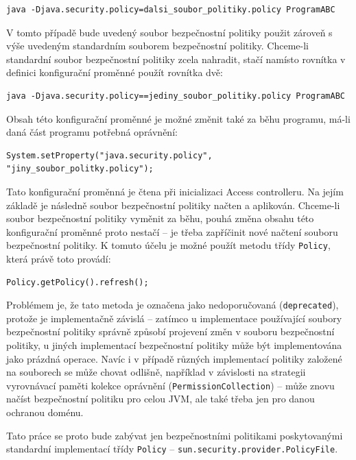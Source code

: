 \begin{verbatim}
java -Djava.security.policy=dalsi_soubor_politiky.policy ProgramABC
\end{verbatim}

V tomto případě bude uvedený soubor bezpečnostní politiky použit zároveň s výše uvedeným standardním souborem bezpečnostní politiky. Chceme-li standardní soubor bezpečnostní politiky zcela nahradit, stačí namísto rovnítka v definici konfigurační proměnné použít rovnítka dvě: \cite[5.3.1]{oaks}

\begin{verbatim}
java -Djava.security.policy==jediny_soubor_politiky.policy ProgramABC
\end{verbatim}

Obsah této konfigurační proměnné je možné změnit také za běhu programu, má-li daná část programu potřebná oprávnění:

\begin{verbatim}
System.setProperty("java.security.policy", "jiny_soubor_politky.policy");
\end{verbatim}

Tato konfigurační proměnná je čtena při inicializaci Access controlleru. Na jejím základě je následně soubor bezpečnostní politiky načten a aplikován. Chceme-li soubor bezpečnostní politiky vyměnit za běhu, pouhá změna obsahu této konfigurační proměnné proto nestačí -- je třeba zapříčinit nové načtení souboru bezpečnostní politiky. K tomuto účelu je možné použít metodu třídy {\tt Policy}, která právě toto provádí:

\begin{verbatim}
Policy.getPolicy().refresh();
\end{verbatim}

Problémem je, že tato metoda je označena jako nedoporučovaná ({\tt deprecated}), protože je implementačně závislá -- zatímco u implementace používající soubory bezpečnostní politiky správně způsobí projevení změn v souboru bezpečnostní politiky, u jiných implementací bezpečnostní politiky může být implementována jako prázdná operace. Navíc i v případě různých implementací politiky založené na souborech se může chovat odlišně, například v závislosti na strategii vyrovnávací paměti kolekce oprávnění ({\tt PermissionCollection}) -- může znovu načíst bezpečnostní politiku pro celou JVM, ale také třeba jen pro danou ochranou doménu. \cite{refPolicy}

Tato práce se proto bude zabývat jen bezpečnostními politikami poskytovanými standardní implementací třídy {\tt Policy} -- {\tt sun.security.provider.PolicyFile}.

